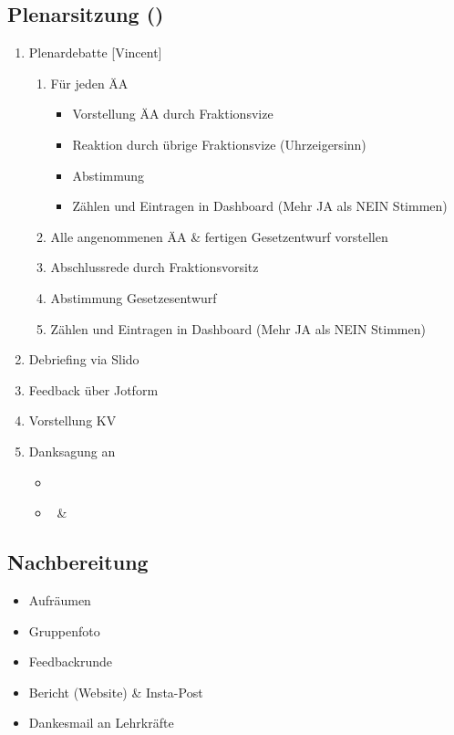 \documentclass{article}
\newcommand{\EP}{Vincent}
\begin{document}
	\subsection{Plenarsitzung (\timePlenar)}
	\begin{enumerate}
		\item Plenardebatte [\EP]
		\begin{enumerate}
			\item Für jeden ÄA
			\begin{itemize}
				\item Vorstellung ÄA durch Fraktionsvize
				\item Reaktion durch übrige Fraktionsvize (Uhrzeigersinn)
				\item Abstimmung
				\item Zählen und Eintragen in Dashboard \newline (Mehr JA als NEIN Stimmen)
			\end{itemize}
			\item Alle angenommenen ÄA \& fertigen Gesetzentwurf vorstellen
			\item Abschlussrede durch Fraktionsvorsitz
			\item Abstimmung Gesetzesentwurf
			\item Zählen und Eintragen in Dashboard (Mehr JA als NEIN Stimmen)
		\end{enumerate}
		\item Debriefing via Slido
		\item Feedback über Jotform
		\item Vorstellung KV
		\item Danksagung an
		\begin{itemize}
			\item \stripPrefix{\location}
			\item \stripPrefix{\sponsor}\iflocalSupportPresent\ \& \stripPrefix{\localSupport}\fi
		\end{itemize}
	\end{enumerate}
	
	\subsection{Nachbereitung}
	\begin{itemize}
		\item Aufräumen
		\item Gruppenfoto
		\item Feedbackrunde
		\item Bericht (Website) \& Insta-Post
		\item Dankesmail an Lehrkräfte
	\end{itemize}
    \newpage
\end{document}
